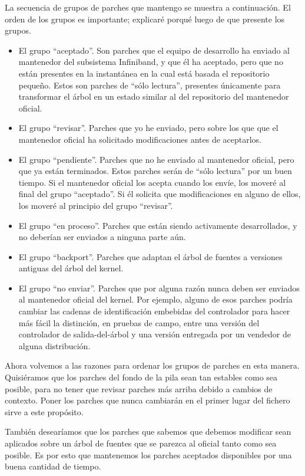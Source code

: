 La secuencia de grupos de parches que mantengo se muestra a
continuación. El orden de los grupos es importante; explicaré porqué
luego de que presente los grupos.
\begin{itemize}
\item El grupo ``aceptado''. Son parches que el equipo de desarrollo
  ha enviado al mantenedor del subsistema Infiniband, y que él ha
  aceptado, pero que no están presentes en la instantánea en la cual
  está basada el repositorio pequeño. Estos son parches de
  ``sólo lectura'', presentes únicamente para transformar el árbol en
  un estado similar al del repositorio del mantenedor oficial.
\item El grupo ``revisar''. Parches que yo he enviado, pero sobre los
  que que el mantenedor oficial ha solicitado modificaciones antes de
  aceptarlos.
\item El grupo ``pendiente''. Parches que no he enviado al mantenedor
  oficial, pero que ya están terminados. Estos parches serán de
  ``sólo lectura'' por un buen tiempo. Si el mantenedor oficial los
  acepta cuando los envíe, los moveré al final del grupo ``aceptado''.
  Si él solicita que modificaciones en alguno de ellos, los moveré al
  principio del grupo ``revisar''.
\item El grupo ``en proceso''. Parches que están siendo activamente
  desarrollados, y no deberían ser enviados a ninguna parte aún.
\item El grupo ``backport''. Parches que adaptan el árbol de fuentes a
    versiones antiguas del árbol del kernel.
\item El grupo ``no enviar''. Parches que por alguna razón nunca deben
  ser enviados al mantenedor oficial del kernel. Por ejemplo, alguno
  de esos parches podría cambiar las cadenas de identificación
  embebidas del controlador para hacer más fácil la distinción, en
  pruebas de campo, entre una versión del controlador de
  salida-del-árbol  y una versión entregada por un vendedor de alguna
  distribución.
\end{itemize}

Ahora volvemos a las razones para ordenar los grupos de parches en
esta manera. Quisiéramos que los parches del fondo de la pila sean tan
estables como sea posible, para no tener que revisar parches más
arriba debido a cambios de contexto. Poner los parches que nunca
cambiarán en el primer lugar del fichero  sirve a
este propósito.

También desearíamos que los parches que sabemos que debemos modificar
sean aplicados sobre un árbol de fuentes que se parezca al oficial
tanto como sea posible. Es por esto que mantenemos los parches
aceptados disponibles por una buena cantidad de tiempo.

